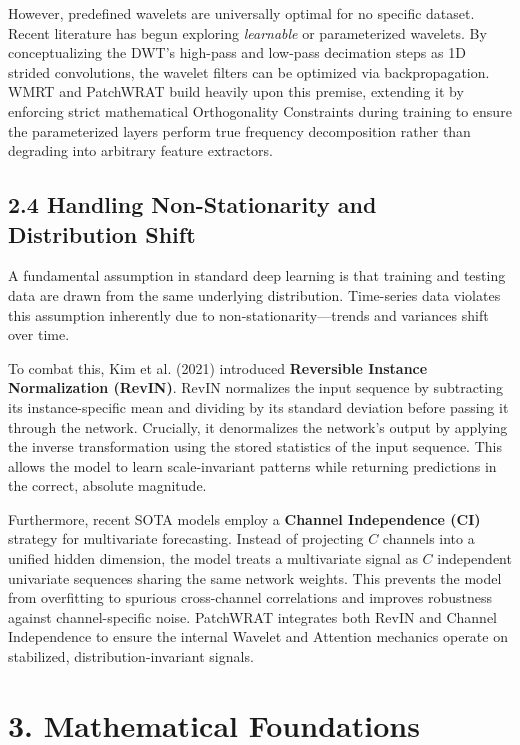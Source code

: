 \documentclass[11pt, letterpaper]{article}
\begin{document}
However, predefined wavelets are universally optimal for no specific dataset. Recent literature has begun exploring \textit{learnable} or parameterized wavelets. By conceptualizing the DWT's high-pass and low-pass decimation steps as 1D strided convolutions, the wavelet filters can be optimized via backpropagation. WMRT and PatchWRAT build heavily upon this premise, extending it by enforcing strict mathematical Orthogonality Constraints during training to ensure the parameterized layers perform true frequency decomposition rather than degrading into arbitrary feature extractors.

\subsection{2.4 Handling Non-Stationarity and Distribution Shift}

A fundamental assumption in standard deep learning is that training and testing data are drawn from the same underlying distribution. Time-series data violates this assumption inherently due to non-stationarity—trends and variances shift over time.

To combat this, Kim et al. (2021) introduced \textbf{Reversible Instance Normalization (RevIN)}. RevIN normalizes the input sequence by subtracting its instance-specific mean and dividing by its standard deviation before passing it through the network. Crucially, it denormalizes the network's output by applying the inverse transformation using the stored statistics of the input sequence. This allows the model to learn scale-invariant patterns while returning predictions in the correct, absolute magnitude.

Furthermore, recent SOTA models employ a \textbf{Channel Independence (CI)} strategy for multivariate forecasting. Instead of projecting $C$ channels into a unified hidden dimension, the model treats a multivariate signal as $C$ independent univariate sequences sharing the same network weights. This prevents the model from overfitting to spurious cross-channel correlations and improves robustness against channel-specific noise. PatchWRAT integrates both RevIN and Channel Independence to ensure the internal Wavelet and Attention mechanics operate on stabilized, distribution-invariant signals.

\section{3. Mathematical Foundations}
\label{sec:math}
\end{document}
